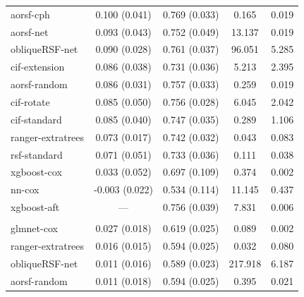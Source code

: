 \documentclass[twoside,11pt]{article}\usepackage[]{graphicx}\usepackage[]{xcolor}
\newenvironment{knitrout}{}{} %
\begin{document}
\begin{knitrout}
\begin{longtable}[t]{lcccc}
\hspace{1em}aorsf-cph & 0.100 (0.041) & 0.769 (0.033) & 0.165 & 0.019\\
\hspace{1em}aorsf-net & 0.093 (0.043) & 0.752 (0.049) & 13.137 & 0.019\\
\hspace{1em}obliqueRSF-net & 0.090 (0.028) & 0.761 (0.037) & 96.051 & 5.285\\
\hspace{1em}cif-extension & 0.086 (0.038) & 0.731 (0.036) & 5.213 & 2.395\\
\hspace{1em}aorsf-random & 0.086 (0.031) & 0.757 (0.033) & 0.259 & 0.019\\
\hspace{1em}cif-rotate & 0.085 (0.050) & 0.756 (0.028) & 6.045 & 2.042\\
\hspace{1em}cif-standard & 0.085 (0.040) & 0.747 (0.035) & 0.289 & 1.106\\
\hspace{1em}ranger-extratrees & 0.073 (0.017) & 0.742 (0.032) & 0.043 & 0.083\\
\hspace{1em}rsf-standard & 0.071 (0.051) & 0.733 (0.036) & 0.111 & 0.038\\
\hspace{1em}xgboost-cox & 0.033 (0.052) & 0.697 (0.109) & 0.374 & 0.002\\
\hspace{1em}nn-cox & -0.003 (0.022) & 0.534 (0.114) & 11.145 & 0.437\\
\hspace{1em}xgboost-aft & --- & 0.756 (0.039) & 7.831 & 0.006\\
\addlinespace[0.3em]
\multicolumn{5}{l}{\textit{\textbf{FCL; relapse, n = 541, p = 7}}}\\
\hline
\hspace{1em}glmnet-cox & 0.027 (0.018) & 0.619 (0.025) & 0.089 & 0.002\\
\hspace{1em}ranger-extratrees & 0.016 (0.015) & 0.594 (0.025) & 0.032 & 0.080\\
\hspace{1em}obliqueRSF-net & 0.011 (0.016) & 0.589 (0.023) & 217.918 & 6.187\\
\hspace{1em}aorsf-random & 0.011 (0.018) & 0.594 (0.025) & 0.395 & 0.021\\

\end{longtable}
\end{knitrout}
\end{document}

